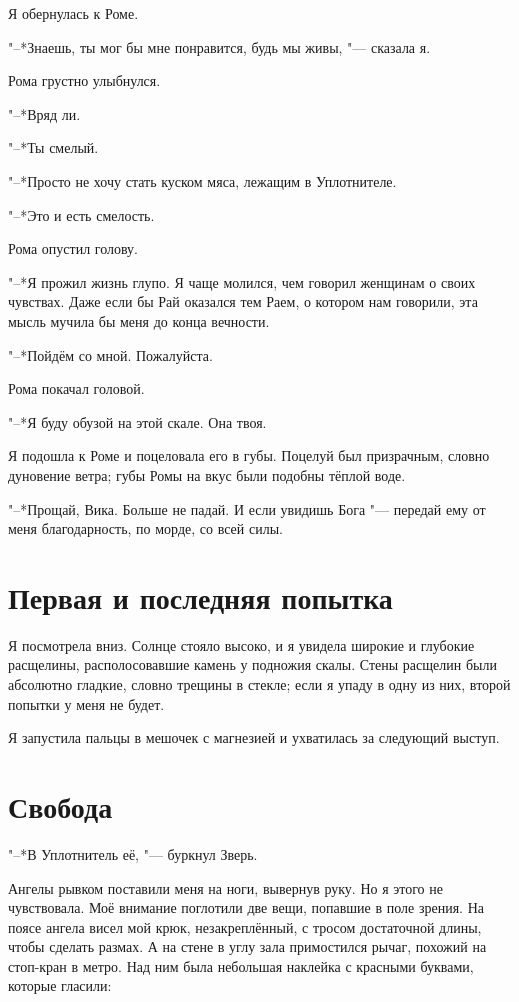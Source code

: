 Я обернулась к Роме.

"--*Знаешь, ты мог бы мне понравится, будь мы живы, "--- сказала я.

Рома грустно улыбнулся.

"--*Вряд ли.

"--*Ты смелый.

"--*Просто не хочу стать куском мяса, лежащим в Уплотнителе.

"--*Это и есть смелость.

Рома опустил голову.

"--*Я прожил жизнь глупо.
Я чаще молился, чем говорил женщинам о своих чувствах.
Даже если бы Рай оказался тем Раем, о котором нам говорили, эта мысль мучила бы меня до конца вечности.

"--*Пойдём со мной.
Пожалуйста.

Рома покачал головой.

"--*Я буду обузой на этой скале.
Она твоя.

Я подошла к Роме и поцеловала его в губы.
Поцелуй был призрачным, словно дуновение ветра;
губы Ромы на вкус были подобны тёплой воде.

"--*Прощай, Вика.
Больше не падай.
И если увидишь Бога "--- передай ему от меня благодарность, по морде, со всей силы.

\section{Первая и последняя попытка}

Я посмотрела вниз.
Солнце стояло высоко, и я увидела широкие и глубокие расщелины, располосовавшие камень у подножия скалы.
Стены расщелин были абсолютно гладкие, словно трещины в стекле;
если я упаду в одну из них, второй попытки у меня не будет.

Я запустила пальцы в мешочек с магнезией и ухватилась за следующий выступ.

\section{Свобода}

"--*В Уплотнитель её, "--- буркнул Зверь.

Ангелы рывком поставили меня на ноги, вывернув руку.
Но я этого не чувствовала.
Моё внимание поглотили две вещи, попавшие в поле зрения.
На поясе ангела висел мой крюк, незакреплённый, с тросом достаточной длины, чтобы сделать размах.
А на стене в углу зала примостился рычаг, похожий на стоп-кран в метро.
Над ним была небольшая наклейка с красными буквами, которые гласили:

